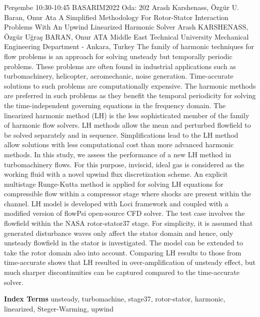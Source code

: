 
    \begin{abstract_basarim}
    {Perşembe 10:30-10:45}
    {BASARIM2022}
    {Oda: 202}
    {Arash Karshenass, Özgür U. Baran, Onur Ata}
    {A Simplified Methodology For Rotor-Stator Interaction Problems With An Upwind Linearized Harmonic Solver}
    {%
    Arash KARSHENASS, Özgür Uğraş BARAN, Onur ATA}
    {%
    }
    {%
    Middle East Technical University Mechanical Engineering Department - Ankara, Turkey}
    The family of harmonic techniques for flow problems is an approach for solving unsteady but temporally periodic problems. These problems are often found in industrial applications such as turbomachinery, helicopter, aeromechanic, noise generation. Time-accurate solutions to such problems are computationally expensive. The harmonic methods are preferred in such problems as they benefit the temporal periodicity for solving the time-independent governing equations in the frequency domain. The linearized harmonic method (LH) is the less sophisticated member of the family of harmonic flow solvers. LH methods allow the mean and perturbed flowfield to be solved separately and in sequence. Simplifications lead to the LH method allow solutions with less computational cost than more advanced harmonic methods. In this study, we assess the performance of a new LH method in turbomachinery flows. For this purpose, inviscid, ideal gas is considered as the working fluid with a novel upwind flux discretization scheme. An explicit multistage Runge-Kutta method is applied for solving LH equations for compressible flow within a compressor stage where shocks are present within the channel. LH model is developed with Loci framework and coupled with a modified version of flowPsi open-source CFD solver. The test case involves the flowfield within the NASA rotor-stator37 stage. For simplicity, it is assumed that generated disturbance waves only affect the stator domain and hence, only unsteady flowfield in the stator is investigated. The model can be extended to take the rotor domain also into account. Comparing LH results to those from time-accurate shows that LH resulted in over-amplification of unsteady effect, but much sharper discontinuities can be captured compared to the time-accurate solver. 
    
            \textbf{Index Terms} \newline{}unsteady, turbomachine, stage37, rotor-stator, harmonic, linearized, Steger-Warming, upwind
    \end{abstract_basarim}
    